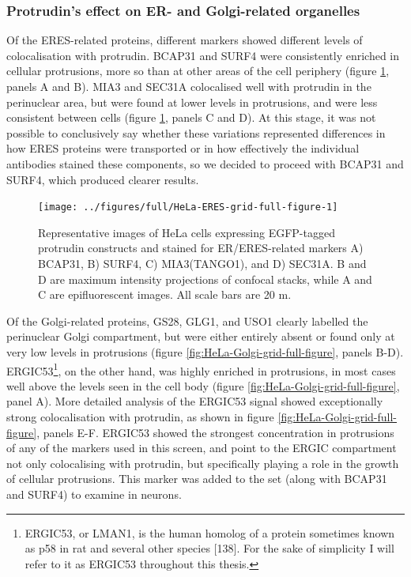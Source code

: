 \documentclass[
  12pt,
  a4paper,
]{book}
\begin{document}
\hypertarget{protrudins-effect-on-er--and-golgi-related-organelles}{%
\subsubsection{Protrudin's effect on ER- and Golgi-related organelles}\label{protrudins-effect-on-er--and-golgi-related-organelles}}

Of the ERES-related proteins, different markers showed different levels of colocalisation with protrudin. BCAP31 and SURF4 were consistently enriched in cellular protrusions, more so than at other areas of the cell periphery (figure \ref{fig:HeLa-ERES-grid-full-figure}, panels A and B). MIA3 and SEC31A colocalised well with protrudin in the perinuclear area, but were found at lower levels in protrusions, and were less consistent between cells (figure \ref{fig:HeLa-ERES-grid-full-figure}, panels C and D). At this stage, it was not possible to conclusively say whether these variations represented differences in how ERES proteins were transported or in how effectively the individual antibodies stained these components, so we decided to proceed with BCAP31 and SURF4, which produced clearer results.

\begin{figure}
\texttt{[image: ../figures/full/HeLa-ERES-grid-full-figure-1]} \caption[Protrudin-expressing HeLa cells stained for BCAP31, SURF4, MIA3, and SEC31A]{Representative images of HeLa cells expressing EGFP-tagged protrudin constructs and stained for ER/ERES-related markers A) BCAP31, B) SURF4, C) MIA3(TANGO1), and D) SEC31A.  B and D are maximum intensity projections of confocal stacks, while A and C are epifluorescent images.  All scale bars are 20 \textmu{}m.}\label{fig:HeLa-ERES-grid-full-figure}
\end{figure}

Of the Golgi-related proteins, GS28, GLG1, and USO1 clearly labelled the perinuclear Golgi compartment, but were either entirely absent or found only at very low levels in protrusions (figure \ref{fig:HeLa-Golgi-grid-full-figure}, panels B-D). ERGIC53\footnote{ERGIC53, or LMAN1, is the human homolog of a protein sometimes known as p58 in rat and several other species {[}138{]}. For the sake of simplicity I will refer to it as ERGIC53 throughout this thesis.}, on the other hand, was highly enriched in protrusions, in most cases well above the levels seen in the cell body (figure \ref{fig:HeLa-Golgi-grid-full-figure}, panel A). More detailed analysis of the ERGIC53 signal showed exceptionally strong colocalisation with protrudin, as shown in figure \ref{fig:HeLa-Golgi-grid-full-figure}, panels E-F. ERGIC53 showed the strongest concentration in protrusions of any of the markers used in this screen, and point to the ERGIC compartment not only colocalising with protrudin, but specifically playing a role in the growth of cellular protrusions. This marker was added to the set (along with BCAP31 and SURF4) to examine in neurons.
\end{document}
